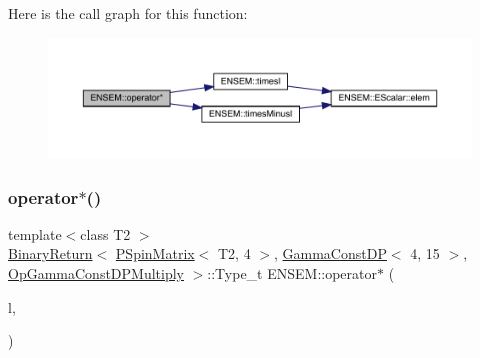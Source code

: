 Here is the call graph for this function\+:\nopagebreak
\begin{figure}[H]
\begin{center}
\leavevmode
\includegraphics[width=350pt]{d6/df5/group__primspinmatrix_ga701841ed0546a547ae068731f72d9054_cgraph}
\end{center}
\end{figure}
\mbox{\label{group__primspinmatrix_ga06378dd69a5d2daf15d11b69a3f42acd}} 
\subsubsection{\texorpdfstring{operator$\ast$()}{operator*()}\hspace{0.1cm}{\footnotesize\ttfamily [64/64]}}
{\footnotesize\ttfamily template$<$class T2 $>$ \\
\mbox{\hyperlink{structENSEM_1_1BinaryReturn}{Binary\+Return}}$<$ \mbox{\hyperlink{classENSEM_1_1PSpinMatrix}{P\+Spin\+Matrix}}$<$ T2, 4 $>$, \mbox{\hyperlink{classENSEM_1_1GammaConstDP}{Gamma\+Const\+DP}}$<$ 4, 15 $>$, \mbox{\hyperlink{structENSEM_1_1OpGammaConstDPMultiply}{Op\+Gamma\+Const\+D\+P\+Multiply}} $>$\+::Type\+\_\+t E\+N\+S\+E\+M\+::operator$\ast$ (\begin{DoxyParamCaption}\item[{const \mbox{\hyperlink{classENSEM_1_1PSpinMatrix}{P\+Spin\+Matrix}}$<$ T2, 4 $>$ \&}]{l,  }\item[{const \mbox{\hyperlink{classENSEM_1_1GammaConstDP}{Gamma\+Const\+DP}}$<$ 4, 15 $>$ \&}]{ }\end{DoxyParamCaption})\hspace{0.3cm}{\ttfamily [inline]}}

\mbox{\label{group__primspinmatrix_ga6ff39d20fc8369664c9b3849e00d654d}} 
